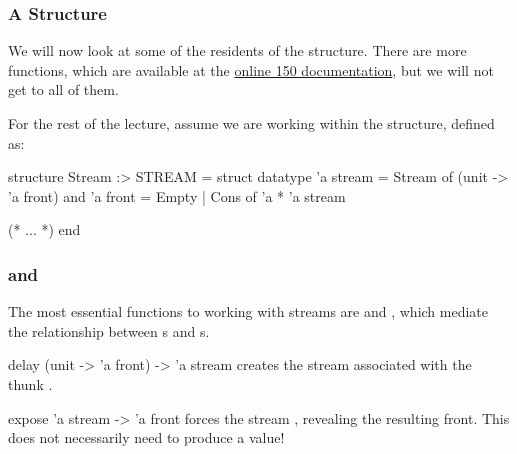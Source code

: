 \documentclass[aspectratio=169, handout]{beamer}
\begin{document}
\begin{frame}[fragile]
  \frametitle{A  Structure}

  We will now look at some of the residents of the  structure.
  There are more functions, which are available at the
  {\color{blue} \href{http://www.cs.cmu.edu/~15150/resources/libraries/stream.pdf}{online 150 documentation}},
  but we will not get to all of them.

  \pause
  \vspace{\fill}

  For the rest of the lecture, assume we are working within the 
  structure, defined as:

  \begin{codeblock}
    structure Stream :> STREAM =
      struct
        datatype 'a stream = Stream of (unit -> 'a front)
        and 'a front = Empty | Cons of 'a * 'a stream

        (* ... *)
      end
  \end{codeblock}
\end{frame}

\begin{frame}[fragile]
  \frametitle{ and }

  The most essential functions to working with streams are 
  and , which mediate the relationship between s and
  s.

  \pause
  \vspace{\fill}

  \spec
    {delay}
    {(unit -> 'a front) -> 'a stream}
    {}
    { creates the stream associated with the thunk .}

  \pause
  \vspace{\fill}

  \spec
    {expose}
    {'a stream -> 'a front}
    {}
    { forces the stream , revealing the resulting front.
    This does not necessarily need to produce a value!}
\end{frame}
\end{document}
